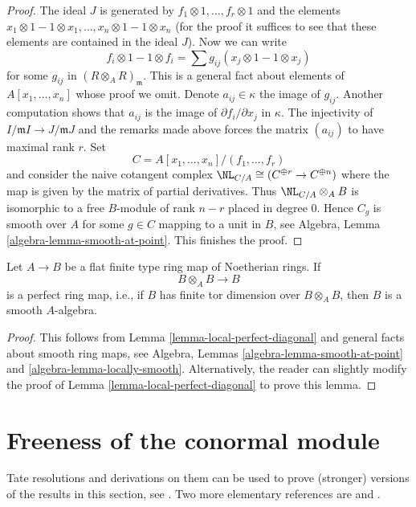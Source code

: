 \begin{proof}
\medskip\noindent
The ideal $J$ is generated by $f_1 \otimes 1, \ldots, f_r \otimes 1$
and the elements $x_1 \otimes 1 - 1 \otimes x_1, \ldots,
x_n \otimes 1 - 1 \otimes x_n$ (for the proof it suffices to
see that these elements are contained in the ideal $J$).
Now we can write
$$
f_i \otimes 1 - 1 \otimes f_i =
\sum g_{ij} (x_j \otimes 1 - 1 \otimes x_j)
$$
for some $g_{ij}$ in $(R \otimes_A R)_\mathfrak m$. This is a general
fact about elements of $A[x_1, \ldots, x_n]$ whose proof we omit.
Denote $a_{ij} \in \kappa$ the image of $g_{ij}$. Another computation
shows that $a_{ij}$ is the image of $\partial f_i / \partial x_j$ in $\kappa$.
The injectivity of $I/\mathfrak m I \to J/\mathfrak m J$ and the remarks
made above forces the matrix $(a_{ij})$ to have maximal rank $r$.
Set
$$
C = A[x_1, \ldots, x_n]/(f_1, \ldots, f_r)
$$
and consider the naive cotangent complex
$\NL_{C/A} \cong (C^{\oplus r} \to C^{\oplus n})$
where the map is given by the matrix of partial derivatives.
Thus $\NL_{C/A} \otimes_A B$
is isomorphic to a free $B$-module of rank $n - r$ placed in degree $0$.
Hence $C_g$ is smooth over $A$ for some $g \in C$ mapping to a unit
in $B$, see Algebra, Lemma \ref{algebra-lemma-smooth-at-point}.
This finishes the proof.
\end{proof}

\begin{lemma}
\label{lemma-perfect-diagonal}
Let $A \to B$ be a flat finite type ring map of Noetherian rings. If
$$
B \otimes_A B \longrightarrow B
$$
is a perfect ring map, i.e., if $B$ has finite tor dimension over
$B \otimes_A B$, then $B$ is a smooth $A$-algebra.
\end{lemma}

\begin{proof}
This follows from Lemma \ref{lemma-local-perfect-diagonal}
and general facts about smooth ring maps, see
Algebra, Lemmas \ref{algebra-lemma-smooth-at-point} and
\ref{algebra-lemma-locally-smooth}.
Alternatively, the reader can slightly modify the proof of
Lemma \ref{lemma-local-perfect-diagonal} to prove
this lemma.
\end{proof}






\section{Freeness of the conormal module}
\label{section-freeness-conormal}

\noindent
Tate resolutions and derivations on them can be used to prove
(stronger) versions of the results in this section, see \cite{Iyengar}.
Two more elementary references are
\cite{Vasconcelos} and \cite{Ferrand-lci}.

